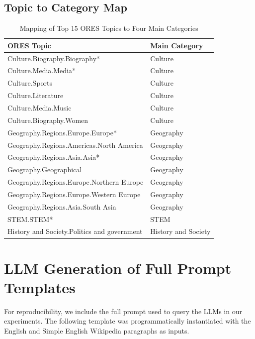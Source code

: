\documentclass{DESSThesis}
\begin{document}
\section{Topic to Category Map}
\begin{table}[H]
\centering
\caption{Mapping of Top 15 ORES Topics to Four Main Categories}
\label{tab:TopicToCategoryMap}
\begin{tabular}{ll}
\toprule
\textbf{ORES Topic} & \textbf{Main Category} \\
\midrule
Culture.Biography.Biography* & Culture \\
Culture.Media.Media* & Culture \\
Culture.Sports & Culture \\
Culture.Literature & Culture \\
Culture.Media.Music & Culture \\
Culture.Biography.Women & Culture \\
Geography.Regions.Europe.Europe* & Geography \\
Geography.Regions.Americas.North America & Geography \\
Geography.Regions.Asia.Asia* & Geography \\
Geography.Geographical & Geography \\
Geography.Regions.Europe.Northern Europe & Geography \\
Geography.Regions.Europe.Western Europe & Geography \\
Geography.Regions.Asia.South Asia & Geography \\
STEM.STEM* & STEM \\
History and Society.Politics and government & History and Society \\
\bottomrule
\end{tabular}
\end{table}

\chapter{LLM Generation of Full Prompt Templates}
\label{appendix:prompts}

\enlargethispage{2\baselineskip}
For reproducibility, we include the full prompt used to query the LLMs in our experiments. 
The following template was programmatically instantiated with the English and Simple English Wikipedia paragraphs as inputs.
\end{document}
